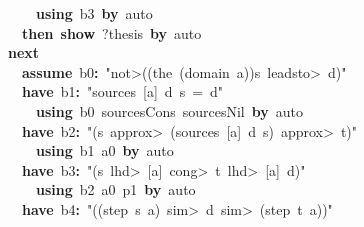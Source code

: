 \documentclass{article}
\newcommand{\syntaxKEYWORDA}[1]{\textcolor[rgb]{0.0,0.4,0.6}{\textbf{#1}}}
\newcommand{\syntaxKEYWORDC}[1]{\textcolor[rgb]{0.0,0.6,1.0}{\textbf{#1}}}
\newcommand{\syntaxLITERALA}[1]{\textcolor[rgb]{1.0,0.0,0.8}{#1}}
\newcommand{\syntaxOPERATOR}[1]{\textcolor[rgb]{0.0,0.0,0.0}{\textbf{#1}}}
\newcommand{\syntaxKEYWORDA}[1]{\textcolor[rgb]{0.0,0.4,0.6}{\textbf{#1}}}
\newcommand{\syntaxKEYWORDC}[1]{\textcolor[rgb]{0.0,0.6,1.0}{\textbf{#1}}}
\newcommand{\syntaxLITERALA}[1]{\textcolor[rgb]{1.0,0.0,0.8}{#1}}
\newcommand{\syntaxOPERATOR}[1]{\textcolor[rgb]{0.0,0.0,0.0}{\textbf{#1}}}
\newcommand{\syntaxKEYWORDA}[1]{\textcolor[rgb]{0.0,0.4,0.6}{\textbf{#1}}}
\newcommand{\syntaxKEYWORDC}[1]{\textcolor[rgb]{0.0,0.6,1.0}{\textbf{#1}}}
\newcommand{\syntaxLITERALA}[1]{\textcolor[rgb]{1.0,0.0,0.8}{#1}}
\newcommand{\syntaxOPERATOR}[1]{\textcolor[rgb]{0.0,0.0,0.0}{\textbf{#1}}}
\newcommand{\syntaxKEYWORDA}[1]{\textcolor[rgb]{0.0,0.4,0.6}{#1}}
\newcommand{\syntaxKEYWORDC}[1]{\textcolor[rgb]{0.0,0.6,1.0}{#1}}
\newcommand{\syntaxLITERALA}[1]{\textcolor[rgb]{1.0,0.0,0.8}{\textbf{#1}}}
\newcommand{\syntaxOPERATOR}[1]{\textcolor[rgb]{0.0,0.0,0.0}{#1}}
\newcommand{\syntaxKEYWORDA}[1]{\textcolor[rgb]{0.0,0.4,0.6}{\textbf{#1}}}
\newcommand{\syntaxKEYWORDC}[1]{\textcolor[rgb]{0.0,0.6,1.0}{\textbf{#1}}}
\newcommand{\syntaxLITERALA}[1]{\textcolor[rgb]{1.0,0.0,0.8}{#1}}
\newcommand{\syntaxOPERATOR}[1]{\textcolor[rgb]{0.0,0.0,0.0}{\textbf{#1}}}
\newcommand{\syntaxKEYWORDA}[1]{\textcolor[rgb]{0.0,0.4,0.6}{\textbf{#1}}}
\newcommand{\syntaxKEYWORDC}[1]{\textcolor[rgb]{0.0,0.6,1.0}{\textbf{#1}}}
\newcommand{\syntaxLITERALA}[1]{\textcolor[rgb]{1.0,0.0,0.8}{#1}}
\newcommand{\syntaxOPERATOR}[1]{\textcolor[rgb]{0.0,0.0,0.0}{\textbf{#1}}}
\begin{document}
{\ }{\ }{\ }{\ }{\ }{\ }{\ }{\ }{\ }{\ }{\ }{\ }{\ }{\ }{\ }{\ }\syntaxKEYWORDA{using}{\ }b3{\ }\syntaxKEYWORDA{by}{\ }auto\hspace*{\fill}\\
{\ }{\ }{\ }{\ }{\ }{\ }{\ }{\ }{\ }{\ }{\ }{\ }{\ }{\ }\syntaxKEYWORDA{then}{\ }\syntaxKEYWORDC{show}{\ }?thesis{\ }\syntaxKEYWORDA{by}{\ }auto\hspace*{\fill}\\
{\ }{\ }{\ }{\ }{\ }{\ }{\ }{\ }{\ }{\ }{\ }{\ }\syntaxKEYWORDA{next}\hspace*{\fill}\\
{\ }{\ }{\ }{\ }{\ }{\ }{\ }{\ }{\ }{\ }{\ }{\ }{\ }{\ }\syntaxKEYWORDC{assume}{\ }b0\syntaxOPERATOR{:}{\ }\syntaxLITERALA{"\<not>((the{\ }(domain{\ }a))\usebox{\atbox}s{\ }\<leadsto>{\ }d)"}\hspace*{\fill}\\
{\ }{\ }{\ }{\ }{\ }{\ }{\ }{\ }{\ }{\ }{\ }{\ }{\ }{\ }\syntaxKEYWORDA{have}{\ }b1\syntaxOPERATOR{:}{\ }\syntaxLITERALA{"sources{\ }{[}a{]}{\ }d{\ }s{\ }={\ }\usebox{\opencurlybracket}d\usebox{\closecurlybracket}"}\hspace*{\fill}\\
{\ }{\ }{\ }{\ }{\ }{\ }{\ }{\ }{\ }{\ }{\ }{\ }{\ }{\ }{\ }{\ }\syntaxKEYWORDA{using}{\ }b0{\ }sources\usebox{\underscorebox}Cons{\ }sources\usebox{\underscorebox}Nil{\ }\syntaxKEYWORDA{by}{\ }auto\hspace*{\fill}\\
{\ }{\ }{\ }{\ }{\ }{\ }{\ }{\ }{\ }{\ }{\ }{\ }{\ }{\ }\syntaxKEYWORDA{have}{\ }b2\syntaxOPERATOR{:}{\ }\syntaxLITERALA{"(s{\ }\<approx>{\ }(sources{\ }{[}a{]}{\ }d{\ }s){\ }\<approx>{\ }t)"}\hspace*{\fill}\\
{\ }{\ }{\ }{\ }{\ }{\ }{\ }{\ }{\ }{\ }{\ }{\ }{\ }{\ }{\ }{\ }\syntaxKEYWORDA{using}{\ }b1{\ }a0{\ }\syntaxKEYWORDA{by}{\ }auto\hspace*{\fill}\\
{\ }{\ }{\ }{\ }{\ }{\ }{\ }{\ }{\ }{\ }{\ }{\ }{\ }{\ }\syntaxKEYWORDA{have}{\ }b3\syntaxOPERATOR{:}{\ }\syntaxLITERALA{"(s{\ }\<lhd>{\ }{[}a{]}{\ }\<cong>{\ }t{\ }\<lhd>{\ }{[}a{]}{\ }\usebox{\atbox}{\ }d)"}\hspace*{\fill}\\
{\ }{\ }{\ }{\ }{\ }{\ }{\ }{\ }{\ }{\ }{\ }{\ }{\ }{\ }{\ }{\ }\syntaxKEYWORDA{using}{\ }b2{\ }a0{\ }p1{\ }\syntaxKEYWORDA{by}{\ }auto\hspace*{\fill}\\
{\ }{\ }{\ }{\ }{\ }{\ }{\ }{\ }{\ }{\ }{\ }{\ }{\ }{\ }\syntaxKEYWORDA{have}{\ }b4\syntaxOPERATOR{:}{\ }\syntaxLITERALA{"((step{\ }s{\ }a){\ }\<sim>{\ }d{\ }\<sim>{\ }(step{\ }t{\ }a))"}\hspace*{\fill}\\
\end{document}
